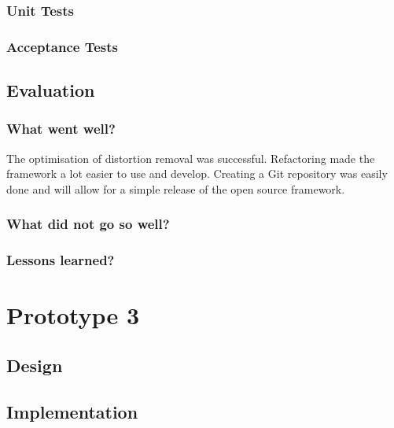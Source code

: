\documentclass[11pt,oneside]{report}
\begin{document}
			\subsubsection{Unit Tests}
			\subsubsection{Acceptance Tests}
			
		\subsection{Evaluation}
			\subsubsection{What went well?}
			The optimisation of distortion removal was successful.
			Refactoring made the framework a lot easier to use and develop.
			Creating a Git repository was easily done and will allow for a simple release of the open source framework.
			\subsubsection{What did not go so well?}
			\subsubsection{Lessons learned?}
	\section{Prototype 3}\label{sec:p3}
		\subsection{Design}
		\subsection{Implementation}
\end{document}
